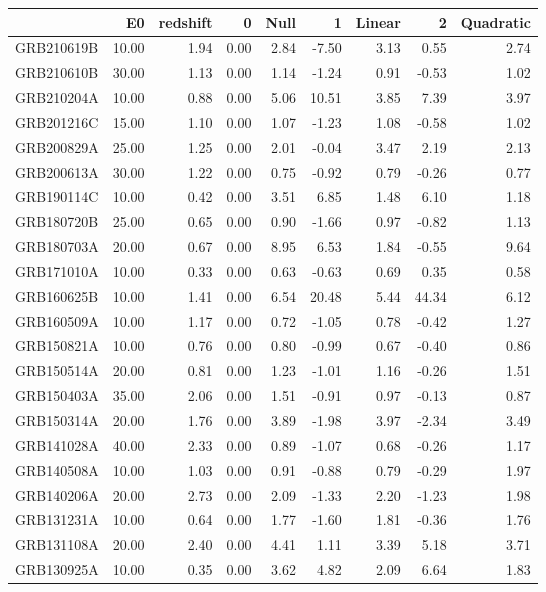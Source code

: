 \begin{tabular}{lrrrrrrrr}
\toprule
 & E0 & redshift & 0 & Null & 1 & Linear & 2 & Quadratic \\
\midrule
GRB210619B & 10.00 & 1.94 & 0.00 & 2.84 & -7.50 & 3.13 & 0.55 & 2.74 \\
GRB210610B & 30.00 & 1.13 & 0.00 & 1.14 & -1.24 & 0.91 & -0.53 & 1.02 \\
GRB210204A & 10.00 & 0.88 & 0.00 & 5.06 & 10.51 & 3.85 & 7.39 & 3.97 \\
GRB201216C & 15.00 & 1.10 & 0.00 & 1.07 & -1.23 & 1.08 & -0.58 & 1.02 \\
GRB200829A & 25.00 & 1.25 & 0.00 & 2.01 & -0.04 & 3.47 & 2.19 & 2.13 \\
GRB200613A & 30.00 & 1.22 & 0.00 & 0.75 & -0.92 & 0.79 & -0.26 & 0.77 \\
GRB190114C & 10.00 & 0.42 & 0.00 & 3.51 & 6.85 & 1.48 & 6.10 & 1.18 \\
GRB180720B & 25.00 & 0.65 & 0.00 & 0.90 & -1.66 & 0.97 & -0.82 & 1.13 \\
GRB180703A & 20.00 & 0.67 & 0.00 & 8.95 & 6.53 & 1.84 & -0.55 & 9.64 \\
GRB171010A & 10.00 & 0.33 & 0.00 & 0.63 & -0.63 & 0.69 & 0.35 & 0.58 \\
GRB160625B & 10.00 & 1.41 & 0.00 & 6.54 & 20.48 & 5.44 & 44.34 & 6.12 \\
GRB160509A & 10.00 & 1.17 & 0.00 & 0.72 & -1.05 & 0.78 & -0.42 & 1.27 \\
GRB150821A & 10.00 & 0.76 & 0.00 & 0.80 & -0.99 & 0.67 & -0.40 & 0.86 \\
GRB150514A & 20.00 & 0.81 & 0.00 & 1.23 & -1.01 & 1.16 & -0.26 & 1.51 \\
GRB150403A & 35.00 & 2.06 & 0.00 & 1.51 & -0.91 & 0.97 & -0.13 & 0.87 \\
GRB150314A & 20.00 & 1.76 & 0.00 & 3.89 & -1.98 & 3.97 & -2.34 & 3.49 \\
GRB141028A & 40.00 & 2.33 & 0.00 & 0.89 & -1.07 & 0.68 & -0.26 & 1.17 \\
GRB140508A & 10.00 & 1.03 & 0.00 & 0.91 & -0.88 & 0.79 & -0.29 & 1.97 \\
GRB140206A & 20.00 & 2.73 & 0.00 & 2.09 & -1.33 & 2.20 & -1.23 & 1.98 \\
GRB131231A & 10.00 & 0.64 & 0.00 & 1.77 & -1.60 & 1.81 & -0.36 & 1.76 \\
GRB131108A & 20.00 & 2.40 & 0.00 & 4.41 & 1.11 & 3.39 & 5.18 & 3.71 \\
GRB130925A & 10.00 & 0.35 & 0.00 & 3.62 & 4.82 & 2.09 & 6.64 & 1.83 \\

\end{tabular}
